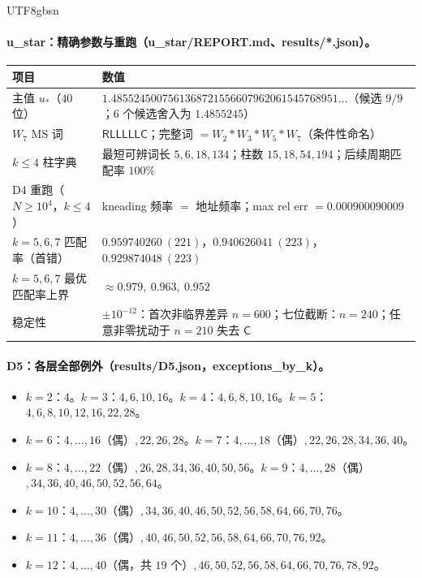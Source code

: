 \documentclass[11pt,a4paper]{article}
\newcommand{\ust}{u_{*}}               %
\theoremstyle{plain}
\theoremstyle{definition}
\begin{document}
\begin{CJK}{UTF8}{gbsn}
\paragraph{u\_star：精确参数与重跑（u\_star/REPORT.md、results/*.json）。}
\begin{center}
\small
\begin{tabular}{p{4.2cm}p{10.2cm}}
\hline
项目 & 数值\\
\hline
主值 $\ust$（$40$ 位） & $1.4855245007561368721556607962061545768951\ldots$（候选 $9/9$；$6$ 个候选舍入为 $1.4855245$）\\
$W_7$ MS 词 & $\mathsf{RLLLLLC}$；完整词 $=W_2*W_3*W_5*W_7$（条件性命名）\\
$k\le4$ 柱字典 & 最短可辨词长 $5,6,18,134$；柱数 $15,18,54,194$；后续周期匹配率 $100\%$\\
D4 重跑（$N\ge10^4$，$k\le4$） & kneading 频率 $=$ 地址频率；max rel err $=0.000900090009$\\
$k=5,6,7$ 匹配率（首错） & $0.959740260\ (221)$，$0.940626041\ (223)$，$0.929874048\ (223)$\\
$k=5,6,7$ 最优匹配率上界 & $\approx0.979,\ 0.963,\ 0.952$\\
稳定性 & $\pm10^{-12}$：首次非临界差异 $n=600$；七位截断：$n=240$；任意非零扰动于 $n=210$ 失去 $\mathsf C$\\
\hline
\end{tabular}
\end{center}

\paragraph{D5：各层全部例外（results/D5.json，exceptions\_by\_k）。}
\begin{itemize}[leftmargin=*]
\item $k=2$：$4$。$k=3$：$4,6,10,16$。$k=4$：$4,6,8,10,16$。$k=5$：$4,6,8,10,12,16,22,28$。
\item $k=6$：$4,\dots,16$（偶）$,22,26,28$。$k=7$：$4,\dots,18$（偶）$,22,26,28,34,36,40$。
\item $k=8$：$4,\dots,22$（偶）$,26,28,34,36,40,50,56$。$k=9$：$4,\dots,28$（偶）$,34,36,40,46,50,52,56,64$。
\item $k=10$：$4,\dots,30$（偶）$,34,36,40,46,50,52,56,58,64,66,70,76$。
\item $k=11$：$4,\dots,36$（偶）$,40,46,50,52,56,58,64,66,70,76,92$。
\item $k=12$：$4,\dots,40$（偶，共 $19$ 个）$,46,50,52,56,58,64,66,70,76,78,92$。
\end{itemize}


\end{CJK}
\end{document}
